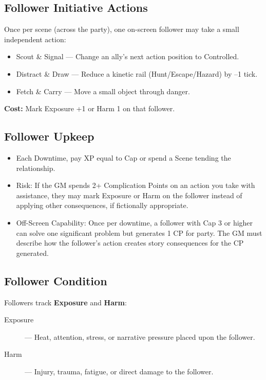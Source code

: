 \subsection*{Follower Initiative Actions}

Once per scene (across the party), one on-screen follower may take a small independent action:

\begin{itemize}
    \item Scout \& Signal --- Change an ally's next action position to Controlled.
    \item Distract \& Draw --- Reduce a kinetic rail (Hunt/Escape/Hazard) by –1 tick.
    \item Fetch \& Carry --- Move a small object through danger.
\end{itemize}

\textbf{Cost:} Mark Exposure +1 or Harm 1 on that follower.

\subsection*{Follower Upkeep}

\begin{itemize}
    \item Each Downtime, pay XP equal to Cap or spend a Scene tending the relationship.
    \item Risk: If the GM spends 2+ Complication Points on an action you take with assistance, they may mark Exposure or Harm on the follower instead of applying other consequences, if fictionally appropriate.
    \item Off-Screen Capability: Once per downtime, a follower with Cap 3 or higher can solve one significant problem but generates 1 CP for party. The GM must describe how the follower's action creates story consequences for the CP generated.
\end{itemize}

\subsection*{Follower Condition}

Followers track \textbf{Exposure} and \textbf{Harm}:

\begin{description}
    \item[Exposure] --- Heat, attention, stress, or narrative pressure placed upon the follower.
    \item[Harm] --- Injury, trauma, fatigue, or direct damage to the follower.
\end{description}

